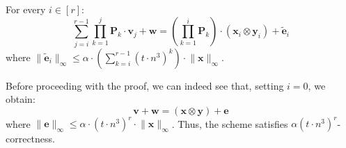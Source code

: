 \documentclass{article}
\begin{document}
\begin{lemma}\label{lmm:correct}
For every $i\in[r]$:
\[\sum_{j=i}^{r-1} \prod_{k=1}^{j} \mathbf{P}_k\cdot\mathbf{v}_j+\mathbf{w}=\left(\prod_{k=1}^{i} \mathbf{P}_k\right)\cdot(\mathbf{x}_{i}\otimes \mathbf{y}_i)+\widetilde{\mathbf{e}}_i\]
where $\lVert \widetilde{\mathbf{e}}_i\rVert_\infty\le \alpha \cdot \left(\sum_{k=i}^{r-1} (t \cdot n^3)^k\right)\cdot \lVert \mathbf{x}\rVert_\infty$.
\end{lemma}
Before proceeding with the proof, we can indeed see that, setting $i=0$, we obtain:
\[\mathbf{v}+\mathbf{w}=(\mathbf{x}\otimes \mathbf{y})+\mathbf{e}\]
where $\lVert\mathbf{e}\rVert_\infty\le \alpha\cdot (t\cdot n^3)^r\cdot \lVert \mathbf{x}\rVert_\infty$.
Thus, the scheme satisfies $\alpha(t\cdot n^3)^r$-correctness.
\end{document}
